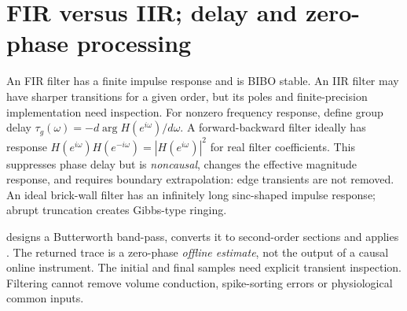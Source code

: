 \section{FIR versus IIR; delay and zero-phase processing}
An FIR filter has a finite impulse response and is BIBO stable.
An IIR filter may have sharper transitions for a given order, but
its poles and finite-precision implementation need inspection.
For nonzero frequency response, define group delay
$\tau_g(\omega)=-d\arg H(e^{i\omega})/d\omega$.
A forward-backward filter ideally has response
$H(e^{i\omega})H(e^{-i\omega})=|H(e^{i\omega})|^2$
for real filter coefficients. This suppresses phase delay but
is \emph{noncausal}, changes the effective magnitude response,
and requires boundary extrapolation: edge transients are not removed.
An ideal brick-wall filter has an infinitely long sinc-shaped
impulse response; abrupt truncation creates Gibbs-type ringing.

\begin{example}
 designs a Butterworth band-pass,
converts it to second-order sections and applies
. The returned trace is a
zero-phase \emph{offline estimate}, not the output of a causal
online instrument. The initial and final samples need explicit
transient inspection. Filtering cannot remove volume conduction,
spike-sorting errors or physiological common inputs.
\end{example}